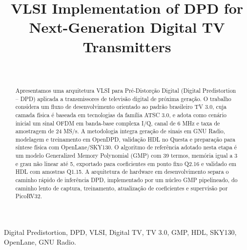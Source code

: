 \documentclass[journal,comsoc]{IEEEtran}
\begin{document}
\IEEEoverridecommandlockouts
{}

\title{VLSI Implementation of DPD for Next-Generation Digital TV Transmitters}

\author{\\
}

\maketitle
{}

\begin{abstract}
Apresentamos uma arquitetura VLSI para Pré-Distorção Digital (Digital Predistortion -- DPD) aplicada a transmissores de televisão digital de próxima geração. O trabalho considera um fluxo de desenvolvimento orientado ao padrão brasileiro TV 3.0, cuja camada física é baseada em tecnologias da família ATSC 3.0, e adota como cenário inicial um sinal OFDM em banda-base complexa I/Q, canal de 6 MHz e taxa de amostragem de 24 MS/s. A metodologia integra geração de sinais em GNU Radio, modelagem e treinamento em OpenDPD, validação HDL no Questa e preparação para síntese física com OpenLane/SKY130. O algoritmo de referência adotado nesta etapa é um modelo Generalized Memory Polynomial (GMP) com 39 termos, memória igual a 3 e grau não linear até 5, exportado para coeficientes em ponto fixo Q2.16 e validado em HDL com amostras Q1.15. A arquitetura de hardware em desenvolvimento separa o caminho rápido de inferência DPD, implementado por um núcleo GMP pipelineado, do caminho lento de captura, treinamento, atualização de coeficientes e supervisão por PicoRV32.
\end{abstract}

\begin{IEEEkeywords}
Digital Predistortion, DPD, VLSI, Digital TV, TV 3.0, GMP, HDL, SKY130, OpenLane, GNU Radio.
\end{IEEEkeywords}

\IEEEpeerreviewmaketitle
\end{document}
